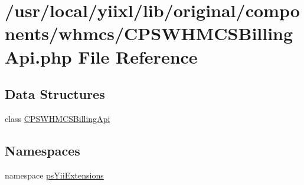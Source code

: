 \hypertarget{CPSWHMCSBillingApi_8php}{
\section{/usr/local/yiixl/lib/original/components/whmcs/CPSWHMCSBillingApi.php File Reference}
\label{CPSWHMCSBillingApi_8php}
}
\subsection*{Data Structures}
\begin{DoxyCompactItemize}
\item 
class \hyperlink{classCPSWHMCSBillingApi}{CPSWHMCSBillingApi}
\end{DoxyCompactItemize}
\subsection*{Namespaces}
\begin{DoxyCompactItemize}
\item 
namespace \hyperlink{namespacepsYiiExtensions}{psYiiExtensions}
\end{DoxyCompactItemize}
